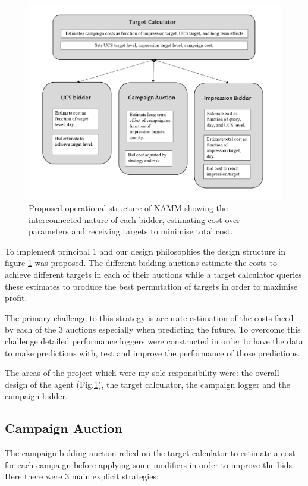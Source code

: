 \documentclass{sig-alternate-05-2015}
\begin{document}
\begin{figure}
\centering
\includegraphics{StructureFlowchart.png}
\caption{Proposed operational structure of NAMM showing the interconnected nature of each bidder, estimating cost over parameters and receiving targets to minimise total cost.}
\label{FlowChart}
\end{figure}

To implement principal 1 and our design philosophies the design structure in figure \ref{FlowChart} was proposed. The different bidding auctions estimate the costs to achieve different targets in each of their auctions while a target calculator queries these estimates to produce the best permutation of targets in order to maximise profit. 

The primary challenge to this strategy is accurate estimation of the costs faced by each of the 3 auctions especially when predicting the future. To overcome this challenge detailed performance loggers were constructed in order to have the data to make predictions with, test and improve the performance of those predictions.

The areas of the project which were my sole responsibility were: the overall design of the agent (Fig.\ref{FlowChart}), the target calculator, the campaign logger and the campaign bidder.
\subsection{Campaign Auction}
The campaign bidding auction relied on the target calculator to estimate a cost for each campaign before applying some modifiers in order to improve the bids. Here there were 3 main explicit strategies: 
\end{document}
